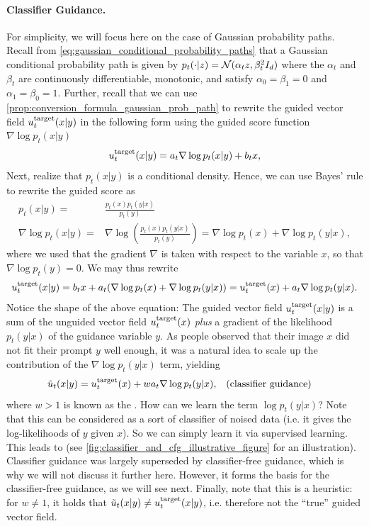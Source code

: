 \paragraph{Classifier Guidance.} For simplicity, we will focus here on the case of Gaussian probability paths. Recall from \cref{eq:gaussian_conditional_probability_paths}
 that a Gaussian conditional probability path is given by $p_t(\cdot|z) = \mathcal{N}(\alpha_t z,\beta_t^2 I_d)$ 
where the  $\alpha_t$ and $\beta_t$ are continuously differentiable, monotonic, and satisfy $\alpha_0 = \beta_1 = 0$ and $\alpha_1 = \beta_0 = 1$. Further, recall that we can use \cref{prop:conversion_formula_gaussian_prob_path} to rewrite the guided vector field $u^{\text{target}}_t(x|y)$ in the following form using the guided score function $\nabla\log p_t(x|y)$
\begin{equation}
    u^{\text{target}}_t(x|y) = a_t\nabla \log p_t(x|y)+b_tx,
\end{equation}
Next, realize that $p_t(x|y)$ is a conditional density. Hence, we can use  Bayes' rule to rewrite the guided score as
\begin{align}
p_t(x|y)=&\frac{p_t(x)p_t(y|x)}{p_t(y)}\\
\nabla \log p_t(x|y) =& \nabla \log \left(\frac{p_t(x)p_t(y|x)}{p_t(y)}\right) = \nabla \log p_t(x) + \nabla \log p_t(y|x), 
\label{eq:bayes_rule}
\end{align}
where we used that the gradient $\nabla$ is taken with respect to the variable $x$, so that $\nabla \log p_t(y) = 0$. We may thus rewrite 
\begin{align*}
    u^{\text{target}}_t(x|y) = b_tx + a_t(\nabla \log p_t(x) + \nabla \log p_t(y|x)) = u^{\text{target}}_t(x) + a_t \nabla \log p_t(y|x).
\end{align*}
Notice the shape of the above equation: The guided vector field $u^{\text{target}}_t(x|y)$ is a sum of the unguided vector field $u^{\text{target}}_t(x)$ \emph{plus} a gradient of the likelihood $p_t(y|x)$ of the guidance variable $y$. As people observed that their image $x$ did not fit their prompt $y$ well enough, it was a natural idea to scale up the contribution of the $\nabla \log p_t(y|x)$ term, yielding
\begin{align}
    \tilde{u}_t(x|y) = u^{\text{target}}_t(x) + w a_t \nabla \log p_t(y|x),\quad &(\text{classifier guidance})
\end{align}
where $w > 1$ is known as the . How can we learn the term $\log p_t(y|x)$? Note that this can be considered as a sort of classifier of noised data (i.e. it gives the log-likelihoods of $y$ given $x$). So we can simply learn it via supervised learning. This leads to  \cite{classifier_guidance, yangsong_sde} (see \cref{fig:classifier_and_cfg_illustrative_figure} for an illustration). Classifier guidance was largely superseded by classifier-free guidance, which is why we will not discuss it further here. However, it forms the basis for the classifier-free guidance, as we will see next. Finally, note that this is a heuristic: for $w \neq 1$, it holds that $\tilde{u}_t(x|y) \neq u^{\text{target}}_t(x|y)$, i.e. therefore not the ``true'' guided vector field.

